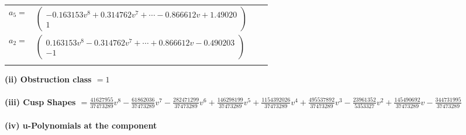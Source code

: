 \documentclass[1p]{elsarticle_modified}
\theoremstyle{definition}
\begin{document}
\begin{tabular}{m{7pt} m{180pt} m{7pt} m{180pt} }
\flushright $a_{5}=$&$\begin{pmatrix}-0.163153 v^{8}+0.314762 v^{7}+\cdots-0.866612 v+1.49020\\1\end{pmatrix}$ \\
\flushright $a_{2}=$&$\begin{pmatrix}0.163153 v^{8}-0.314762 v^{7}+\cdots+0.866612 v-0.490203\\-1\end{pmatrix}$\\&\end{tabular}
\flushleft \textbf{(ii) Obstruction class $= 1$}\\~\\
\flushleft \textbf{(iii) Cusp Shapes $= \frac{41627955}{37473289} v^8-\frac{61862036}{37473289} v^7-\frac{282471299}{37473289} v^6+\frac{146298199}{37473289} v^5+\frac{1154392026}{37473289} v^4+\frac{495537892}{37473289} v^3-\frac{23961352}{5353327} v^2+\frac{145490692}{37473289} v-\frac{344731995}{37473289}$}\\~\\
\newpage\renewcommand{\arraystretch}{1}
\flushleft \textbf{(iv) u-Polynomials at the component}\newline \\
\end{document}
